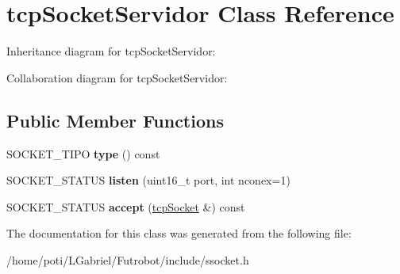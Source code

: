 \hypertarget{classtcpSocketServidor}{}\section{tcp\+Socket\+Servidor Class Reference}
\label{classtcpSocketServidor}


Inheritance diagram for tcp\+Socket\+Servidor\+:


Collaboration diagram for tcp\+Socket\+Servidor\+:
\subsection*{Public Member Functions}
\begin{DoxyCompactItemize}
\item 
S\+O\+C\+K\+E\+T\+\_\+\+T\+I\+PO {\bfseries type} () const \hypertarget{classtcpSocketServidor_a46062aa9ce0cc55355ca626b554deb03}{}\label{classtcpSocketServidor_a46062aa9ce0cc55355ca626b554deb03}

\item 
S\+O\+C\+K\+E\+T\+\_\+\+S\+T\+A\+T\+US {\bfseries listen} (uint16\+\_\+t port, int nconex=1)\hypertarget{classtcpSocketServidor_a2df49f2eb30a16c764bd7258be134a1d}{}\label{classtcpSocketServidor_a2df49f2eb30a16c764bd7258be134a1d}

\item 
S\+O\+C\+K\+E\+T\+\_\+\+S\+T\+A\+T\+US {\bfseries accept} (\hyperlink{classtcpSocket}{tcp\+Socket} \&) const \hypertarget{classtcpSocketServidor_a2b1cfa6c474a6499d93ed64b9f59fd76}{}\label{classtcpSocketServidor_a2b1cfa6c474a6499d93ed64b9f59fd76}

\end{DoxyCompactItemize}


The documentation for this class was generated from the following file\+:\begin{DoxyCompactItemize}
\item 
/home/poti/\+L\+Gabriel/\+Futrobot/include/ssocket.\+h\end{DoxyCompactItemize}
